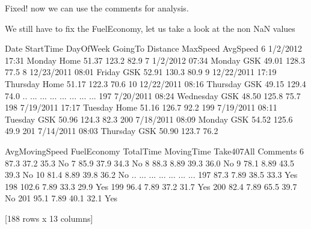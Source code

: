 \documentclass[letterpaper,10pt,english]{jupyterBook}
\begin{document}
\sphinxAtStartPar
Fixed! now we can use the comments for analysis.

\sphinxAtStartPar
We still have to fix the FuelEconomy, let us take a look at the non NaN values

\begin{sphinxVerbatim}[commandchars=\\\{\}]
\PYG{p}{[}\PYG{p}{]}
\end{sphinxVerbatim}

\begin{sphinxVerbatim}[commandchars=\\\{\}]
           Date StartTime  DayOfWeek GoingTo  Distance  MaxSpeed  AvgSpeed  \PYGZbs{}
6      1/2/2012     17:31     Monday    Home     51.37     123.2      82.9   
7      1/2/2012     07:34     Monday     GSK     49.01     128.3      77.5   
8    12/23/2011     08:01     Friday     GSK     52.91     130.3      80.9   
9    12/22/2011     17:19   Thursday    Home     51.17     122.3      70.6   
10   12/22/2011     08:16   Thursday     GSK     49.15     129.4      74.0   
..          ...       ...        ...     ...       ...       ...       ...   
197   7/20/2011     08:24  Wednesday     GSK     48.50     125.8      75.7   
198   7/19/2011     17:17    Tuesday    Home     51.16     126.7      92.2   
199   7/19/2011     08:11    Tuesday     GSK     50.96     124.3      82.3   
200   7/18/2011     08:09     Monday     GSK     54.52     125.6      49.9   
201   7/14/2011     08:03   Thursday     GSK     50.90     123.7      76.2   

     AvgMovingSpeed FuelEconomy  TotalTime  MovingTime Take407All Comments  
6              87.3           \PYGZhy{}       37.2        35.3         No           
7              85.9           \PYGZhy{}       37.9        34.3         No           
8              88.3        8.89       39.3        36.0         No           
9              78.1        8.89       43.5        39.3         No           
10             81.4        8.89       39.8        36.2         No           
..              ...         ...        ...         ...        ...      ...  
197            87.3        7.89       38.5        33.3        Yes           
198           102.6        7.89       33.3        29.9        Yes           
199            96.4        7.89       37.2        31.7        Yes           
200            82.4        7.89       65.5        39.7         No           
201            95.1        7.89       40.1        32.1        Yes           

[188 rows x 13 columns]
\end{sphinxVerbatim}
\end{document}
